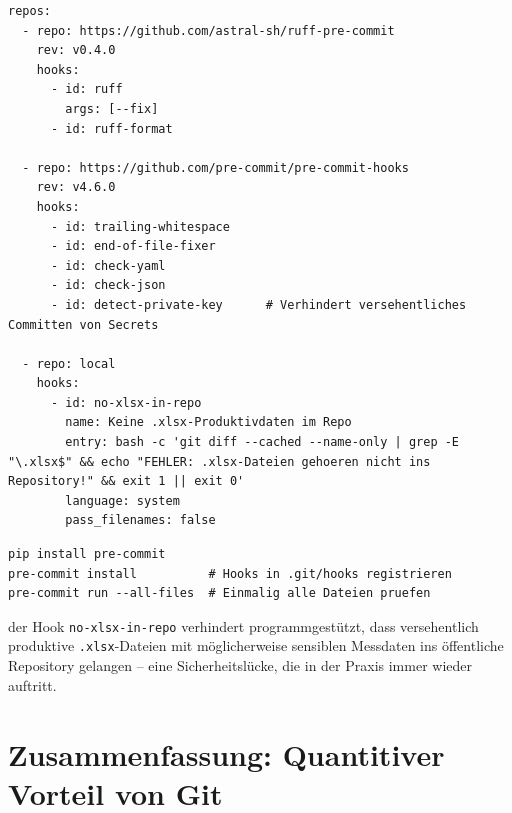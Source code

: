 ﻿\documentclass[12pt,a4paper]{report}
\theoremstyle{definition}
\theoremstyle{remark}
\newcommand{\code}[1]{\texttt{#1}}
\begin{document}
\begin{lstlisting}[style=yaml, caption={.pre-commit-config.yaml -- Lokale Qualitaetssicherung}]
repos:
  - repo: https://github.com/astral-sh/ruff-pre-commit
    rev: v0.4.0
    hooks:
      - id: ruff
        args: [--fix]
      - id: ruff-format

  - repo: https://github.com/pre-commit/pre-commit-hooks
    rev: v4.6.0
    hooks:
      - id: trailing-whitespace
      - id: end-of-file-fixer
      - id: check-yaml
      - id: check-json
      - id: detect-private-key      # Verhindert versehentliches Committen von Secrets

  - repo: local
    hooks:
      - id: no-xlsx-in-repo
        name: Keine .xlsx-Produktivdaten im Repo
        entry: bash -c 'git diff --cached --name-only | grep -E "\.xlsx$" && echo "FEHLER: .xlsx-Dateien gehoeren nicht ins Repository!" && exit 1 || exit 0'
        language: system
        pass_filenames: false
\end{lstlisting}

\begin{lstlisting}[style=bash, caption={pre-commit installieren und aktivieren}]
pip install pre-commit
pre-commit install          # Hooks in .git/hooks registrieren
pre-commit run --all-files  # Einmalig alle Dateien pruefen
\end{lstlisting}

der Hook \code{no-xlsx-in-repo} verhindert programmgestützt, dass
versehentlich produktive \code{.xlsx}-Dateien mit möglicherweise
sensiblen Messdaten ins öffentliche Repository gelangen --
eine Sicherheitslücke, die in der Praxis immer wieder auftritt.

\section{Zusammenfassung: Quantitiver Vorteil von Git}
\end{document}
